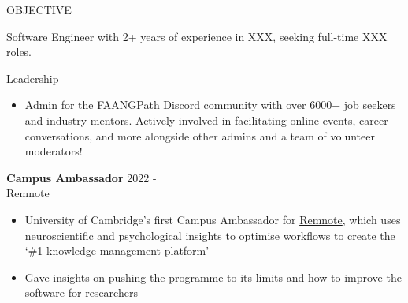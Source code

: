 




\begin{rSection}{OBJECTIVE}

{Software Engineer with 2+ years of experience in XXX, seeking full-time XXX roles.}

\end{rSection}



\begin{rSection}{Leadership} 
\begin{itemize}
    \item Admin for the \href{https://discord.com/invite/WWbjEaZ}{FAANGPath Discord community} with over 6000+ job seekers and industry mentors. Actively involved in facilitating online events, career conversations, and more alongside other admins and a team of volunteer moderators! 
\end{itemize}


\end{rSection}


  \textbf{Campus Ambassador} \hfill 2022 - \\
Remnote 
\vspace{-0.5em}
 \begin{itemize}
    \itemsep -3pt {} 
    \item University of Cambridge's first Campus Ambassador for \href{https://www.remnote.com}{Remnote}, which uses neuroscientific and psychological insights to optimise workflows to create the `\#1 knowledge management platform'
    \item Gave insights on pushing the programme to its limits and how to improve the software for researchers
 \end{itemize}

